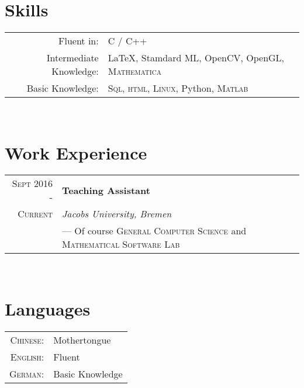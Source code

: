 \documentclass[a4paper,10pt]{article}
\begin{document}
	~\\
	
	\section{Skills}
	\begin{tabular}{rl}
		Fluent in: & \textsc{C / C++}\\
		Intermediate Knowledge:& {\fb \LaTeX}, Stamdard ML, OpenCV, OpenGL, \textsc{Mathematica}\\
		Basic Knowledge:& \textsc{Sql}, \textsc{html}, \textsc{Linux}, Python,  \textsc{Matlab}\\
	\end{tabular}
	
	
	~\\
	
	\section{Work Experience}
	\begin{tabular}{r|l}
		\textsc{Sept 2016 - } & \textbf{Teaching Assistant} \\\textsc{Current}&\emph{Jacobs University, Bremen}
		\\& --- Of course \textsc{General Computer Science} and \textsc{Mathematical Software Lab}
	\end{tabular}
	
	~\\
	
	\section{Languages}
	\begin{tabular}{rl}
		\textsc{Chinese:}&Mothertongue\\
		\textsc{English:}&Fluent\\
		\textsc{German:}&Basic Knowledge\\
	\end{tabular}
	
\end{document}
